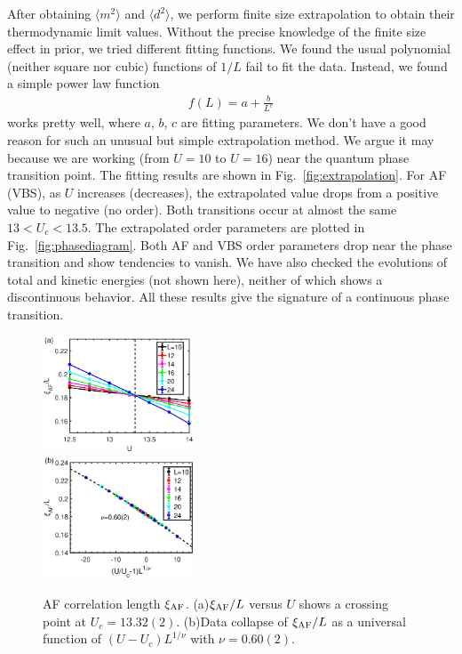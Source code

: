 \documentclass[twocolumn,superscriptaddress,prb]{revtex4-1}
\begin{document}
After obtaining $\langle m^2 \rangle$ and $\langle d^2 \rangle$, we perform finite size extrapolation to obtain their thermodynamic limit values. Without the precise knowledge of the finite size effect in prior, we tried different fitting functions. We found the usual polynomial (neither square nor cubic) functions of $1/L$ fail to fit the data. Instead, we found a simple power law function
\begin{eqnarray}\label{eq:fitting}
f(L)=a+\frac{b}{L^c}
\end{eqnarray}
works pretty well, where $a$, $b$, $c$ are fitting parameters. We don't have a good reason for such an unusual but simple extrapolation method. We argue it may because we are working (from $U=10$ to $U=16$) near the quantum phase transition point. The fitting results are shown in Fig.~\ref{fig:extrapolation}. For AF (VBS), as $U$ increases (decreases), the extrapolated value drops from a positive value to negative (no order). Both transitions occur at almost the same $13<U_c<13.5$. The extrapolated order parameters are plotted in Fig.~\ref{fig:phasediagram}. Both AF and VBS order parameters drop near the phase transition and show tendencies to vanish. We have also checked the evolutions of total and kinetic energies (not shown here), neither of which shows a discontinuous behavior. All these results give the signature of a continuous phase transition.


\begin{figure}
	\includegraphics[width=0.4\textwidth]{correlationlength_af}\\
	\includegraphics[width=0.4\textwidth]{datacollapse_xi}
	\caption{\label{fig:correlationlength_af} AF correlation length $\xi_{\rm AF}$. (a)$\xi_{\rm AF}/L$ versus $U$ shows a crossing point at $U_c=13.32(2)$. (b)Data collapse of $\xi_{\rm AF}/L$ as a universal function of $(U-U_c)L^{1/\nu}$ with $\nu=0.60(2)$.}
\end{figure}
\end{document}
